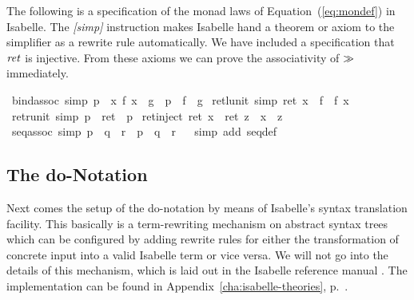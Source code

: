 The following is a specification of the monad laws of Equation~(\ref{eq:mondef})
in Isabelle. The \emph{[simp]} instruction makes Isabelle hand a theorem
or axiom to the simplifier as a rewrite rule automatically. We have included a
specification that $\mathit{ret}$ is injective. From these axioms
we can prove the associativity of $\gg$ immediately.
\begin{isabellebody}
\isanewline
\isamarkuptrue%
\isanewline
\ bind{\isacharunderscore}assoc\ {\isacharbrackleft}simp{\isacharbrackright}{\isacharcolon}\ {\isachardoublequote}{\isacharparenleft}p\ {\isasymggreater}{\isacharequal}\ {\isacharparenleft}{\isasymlambda}x{\isachardot}\ f\ x\ {\isasymggreater}{\isacharequal}\ g{\isacharparenright}{\isacharparenright}\ {\isacharequal}\ {\isacharparenleft}p\ {\isasymggreater}{\isacharequal}\ f\ {\isasymggreater}{\isacharequal}\ g{\isacharparenright}{\isachardoublequote}\isanewline
\ ret{\isacharunderscore}lunit\ {\isacharbrackleft}simp{\isacharbrackright}{\isacharcolon}\ {\isachardoublequote}{\isacharparenleft}ret\ x\ {\isasymggreater}{\isacharequal}\ f{\isacharparenright}\ {\isacharequal}\ f\ x{\isachardoublequote}\isanewline
\ ret{\isacharunderscore}runit\ {\isacharbrackleft}simp{\isacharbrackright}{\isacharcolon}\ {\isachardoublequote}{\isacharparenleft}p\ {\isasymggreater}{\isacharequal}\ ret{\isacharparenright}\ {\isacharequal}\ p{\isachardoublequote}\isanewline
\ ret{\isacharunderscore}inject{\isacharcolon}\ {\isachardoublequote}ret\ x\ {\isacharequal}\ ret\ z\ {\isasymLongrightarrow}\ x\ {\isacharequal}\ z{\isachardoublequote}\isanewline
\isanewline
\isamarkupfalse%
\ seq{\isacharunderscore}assoc\ {\isacharbrackleft}simp{\isacharbrackright}{\isacharcolon}\ {\isachardoublequote}{\isacharparenleft}p\ {\isasymggreater}\ {\isacharparenleft}q\ {\isasymggreater}\ r{\isacharparenright}{\isacharparenright}\ {\isacharequal}\ {\isacharparenleft}p\ {\isasymggreater}\ q\ {\isasymggreater}\ r{\isacharparenright}{\isachardoublequote}\isanewline
\ \isamarkupfalse%
\ {\isacharparenleft}simp\ add{\isacharcolon}\ seq{\isacharunderscore}def{\isacharparenright}\isamarkupfalse%
\isanewline%
\end{isabellebody}

\subsection{The do-Notation}
Next comes the setup of the do-notation by means of Isabelle's syntax
translation facility. This basically is a term-rewriting mechanism on abstract
syntax trees which can be configured by adding rewrite rules for either the
transformation of concrete input into a valid Isabelle term or vice versa. We
will not go into the details of this mechanism, which is laid out in the
Isabelle reference manual \cite{IsaRef04}. The implementation can be found in
Appendix~\ref{cha:isabelle-theories}, p.~\pageref{isa:do-notation}.


